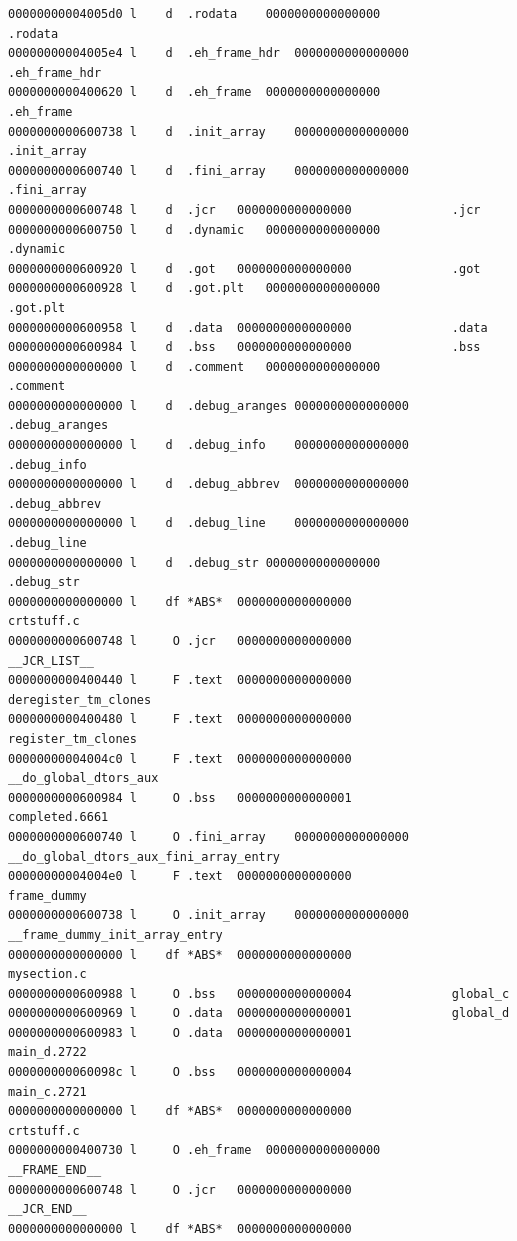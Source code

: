 \begin{verbatim}
00000000004005d0 l    d  .rodata	0000000000000000              .rodata
00000000004005e4 l    d  .eh_frame_hdr	0000000000000000              .eh_frame_hdr
0000000000400620 l    d  .eh_frame	0000000000000000              .eh_frame
0000000000600738 l    d  .init_array	0000000000000000              .init_array
0000000000600740 l    d  .fini_array	0000000000000000              .fini_array
0000000000600748 l    d  .jcr	0000000000000000              .jcr
0000000000600750 l    d  .dynamic	0000000000000000              .dynamic
0000000000600920 l    d  .got	0000000000000000              .got
0000000000600928 l    d  .got.plt	0000000000000000              .got.plt
0000000000600958 l    d  .data	0000000000000000              .data
0000000000600984 l    d  .bss	0000000000000000              .bss
0000000000000000 l    d  .comment	0000000000000000              .comment
0000000000000000 l    d  .debug_aranges	0000000000000000              .debug_aranges
0000000000000000 l    d  .debug_info	0000000000000000              .debug_info
0000000000000000 l    d  .debug_abbrev	0000000000000000              .debug_abbrev
0000000000000000 l    d  .debug_line	0000000000000000              .debug_line
0000000000000000 l    d  .debug_str	0000000000000000              .debug_str
0000000000000000 l    df *ABS*	0000000000000000              crtstuff.c
0000000000600748 l     O .jcr	0000000000000000              __JCR_LIST__
0000000000400440 l     F .text	0000000000000000              deregister_tm_clones
0000000000400480 l     F .text	0000000000000000              register_tm_clones
00000000004004c0 l     F .text	0000000000000000              __do_global_dtors_aux
0000000000600984 l     O .bss	0000000000000001              completed.6661
0000000000600740 l     O .fini_array	0000000000000000              __do_global_dtors_aux_fini_array_entry
00000000004004e0 l     F .text	0000000000000000              frame_dummy
0000000000600738 l     O .init_array	0000000000000000              __frame_dummy_init_array_entry
0000000000000000 l    df *ABS*	0000000000000000              mysection.c
0000000000600988 l     O .bss	0000000000000004              global_c
0000000000600969 l     O .data	0000000000000001              global_d
0000000000600983 l     O .data	0000000000000001              main_d.2722
000000000060098c l     O .bss	0000000000000004              main_c.2721
0000000000000000 l    df *ABS*	0000000000000000              crtstuff.c
0000000000400730 l     O .eh_frame	0000000000000000              __FRAME_END__
0000000000600748 l     O .jcr	0000000000000000              __JCR_END__
0000000000000000 l    df *ABS*	0000000000000000              

\end{verbatim}
